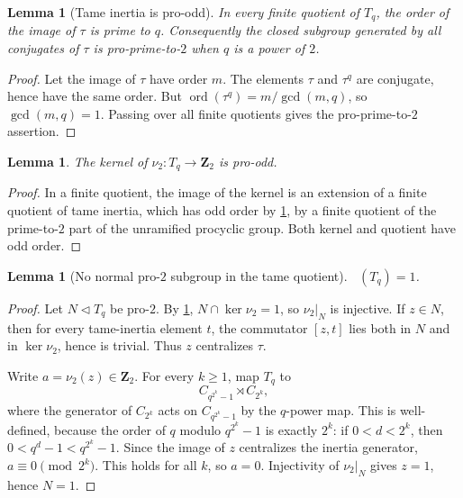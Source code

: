 \documentclass[11pt,reqno]{amsart}
\newtheorem{lemma}[theorem]{Lemma}
\theoremstyle{remark}
\numberwithin{equation}{section}
\newcommand{\Z}{\mathbf Z}
\DeclareMathOperator{\Otwo}{O_2}
\begin{document}
\begin{lemma}[Tame inertia is pro-odd]\label{lem:tame-odd}
In every finite quotient of \(T_q\), the order of the image of \(\tau\) is
prime to \(q\).  Consequently the closed subgroup generated by all
conjugates of \(\tau\) is pro-prime-to-\(2\) when \(q\) is a power of
\(2\).
\end{lemma}

\begin{proof}
Let the image of \(\tau\) have order \(m\).  The elements \(\tau\) and
\(\tau^q\) are conjugate, hence have the same order.  But
\(\operatorname{ord}(\tau^q)=m/\gcd(m,q)\), so \(\gcd(m,q)=1\).  Passing
over all finite quotients gives the pro-prime-to-\(2\) assertion.
\end{proof}

\begin{lemma}\label{lem:ker-nu-odd}
The kernel of \(\nu_2:T_q\to\Z_2\) is pro-odd.
\end{lemma}

\begin{proof}
In a finite quotient, the image of the kernel is an extension of a finite
quotient of tame inertia, which has odd order by \cref{lem:tame-odd}, by a
finite quotient of the prime-to-\(2\) part of the unramified procyclic
group.  Both kernel and quotient have odd order.
\end{proof}

\begin{lemma}[No normal pro-\(2\) subgroup in the tame quotient]
\label{lem:O2-tame}
\(\Otwo(T_q)=1\).
\end{lemma}

\begin{proof}
Let \(N\triangleleft T_q\) be pro-\(2\).  By \cref{lem:ker-nu-odd},
\(N\cap\ker\nu_2=1\), so \(\nu_2|_N\) is injective.  If \(z\in N\), then
for every tame-inertia element \(t\), the commutator \([z,t]\) lies both
in \(N\) and in \(\ker\nu_2\), hence is trivial.  Thus \(z\) centralizes
\(\tau\).

Write \(a=\nu_2(z)\in\Z_2\).  For every \(k\ge1\), map \(T_q\) to
\[
 C_{q^{2^k}-1}\rtimes C_{2^k},
\]
where the generator of \(C_{2^k}\) acts on
\(C_{q^{2^k}-1}\) by the \(q\)-power map.  This is well-defined, because
the order of \(q\) modulo \(q^{2^k}-1\) is exactly \(2^k\): if
\(0<d<2^k\), then \(0<q^d-1<q^{2^k}-1\).  Since the image of \(z\)
centralizes the inertia generator, \(a\equiv0\pmod{2^k}\).  This holds for
all \(k\), so \(a=0\).  Injectivity of \(\nu_2|_N\) gives \(z=1\), hence
\(N=1\).
\end{proof}
\end{document}
